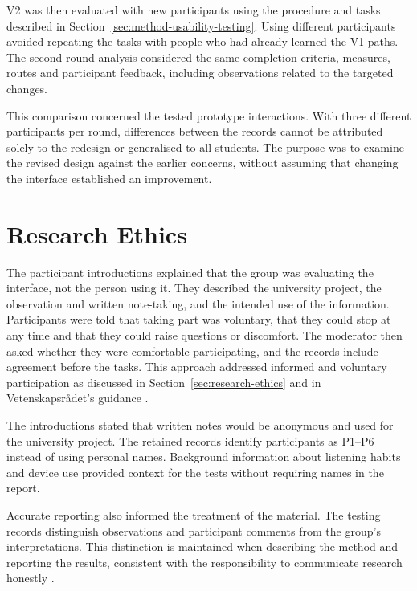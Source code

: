 V2 was then evaluated with new participants using the procedure and tasks
described in Section~\ref{sec:method-usability-testing}. Using different
participants avoided repeating the tasks with people who had already learned
the V1 paths. The second-round analysis considered the same completion
criteria, measures, routes and participant feedback, including observations
related to the targeted changes.

This comparison concerned the tested prototype interactions. With three
different participants per round, differences between the records cannot
be attributed solely to the redesign or generalised to all students. The
purpose was to examine the revised design against the earlier concerns,
without assuming that changing the interface established an improvement.

\section{Research Ethics}
\label{sec:method-research-ethics}

The participant introductions explained that the group was evaluating the
interface, not the person using it. They described the university project,
the observation and written note-taking, and the intended use of the
information. Participants were told that taking part was voluntary, that
they could stop at any time and that they could raise questions or
discomfort. The moderator then asked whether they were comfortable
participating, and the records include agreement before the tasks.
This approach addressed informed and voluntary participation as discussed
in Section~\ref{sec:research-ethics} and in Vetenskapsr\aa{}det's guidance
\cite[pp.~62--63]{vetenskapsradet2024}.

The introductions stated that written notes would be anonymous and used for
the university project. The retained records identify participants as
P1--P6 instead of using personal names. Background information about
listening habits and device use provided context for the tests without
requiring names in the report.

Accurate reporting also informed the treatment of the material. The testing
records distinguish observations and participant comments from the group's
interpretations. This distinction is maintained when describing the method
and reporting the results, consistent with the responsibility to communicate
research honestly \cite[pp.~11--12]{vetenskapsradet2024}.
